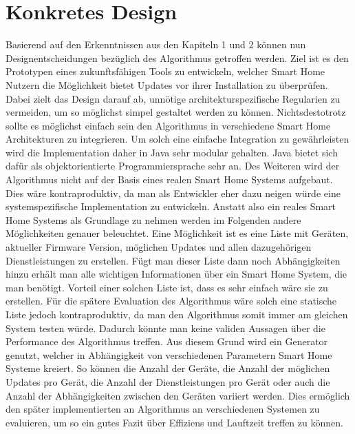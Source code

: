 \section{Konkretes Design}
Basierend auf den Erkenntnissen aus den Kapiteln 1 und 2 können nun Designentscheidungen bezüglich des Algorithmus getroffen
werden. Ziel ist es den Prototypen eines zukunftsfähigen Tools zu entwickeln, welcher Smart Home Nutzern die Möglichkeit bietet
Updates vor ihrer Installation zu überprüfen.
Dabei zielt das Design darauf ab, unnötige architekturspezifische Regularien zu vermeiden, um so möglichst simpel
gestaltet werden zu können. Nichtsdestotrotz sollte es möglichst einfach sein den Algorithmus in verschiedene Smart Home 
Architekturen zu integrieren. Um solch eine einfache Integration zu gewährleisten wird die Implementation daher
in Java sehr modular gehalten. Java bietet sich dafür als objektorientierte Programmiersprache sehr an.
Des Weiteren wird der Algorithmus nicht auf der Basis eines realen Smart Home Systems aufgebaut. Dies wäre kontraproduktiv,
da man als Entwickler eher dazu neigen würde eine systemspezifische Implementation zu entwickeln. Anstatt also ein reales
Smart Home Systems als Grundlage zu nehmen werden im Folgenden andere Möglichkeiten genauer beleuchtet. 
Eine Möglichkeit ist es eine Liste mit 
Geräten, aktueller Firmware Version, möglichen Updates und allen dazugehörigen Dienstleistungen zu erstellen. Fügt
man dieser Liste dann noch Abhängigkeiten hinzu erhält man alle wichtigen Informationen über ein Smart Home System,
die man benötigt. Vorteil einer solchen Liste ist, dass es sehr einfach wäre sie zu erstellen. Für die spätere Evaluation des 
Algorithmus wäre solch eine statische Liste jedoch kontraproduktiv, da man den Algorithmus somit immer am gleichen 
System testen würde. Dadurch könnte man keine validen Aussagen über die Performance des Algorithmus treffen. Aus 
diesem Grund wird ein Generator genutzt, welcher in Abhängigkeit von verschiedenen Parametern Smart Home Systeme kreiert.
So können die Anzahl der Geräte, die Anzahl der möglichen 
Updates pro Gerät, die Anzahl der Dienstleistungen pro Gerät oder auch die Anzahl der Abhängigkeiten zwischen den
Geräten variiert werden. Dies ermöglich den später implementierten an Algorithmus an verschiedenen Systemen zu 
evaluieren, um so ein gutes Fazit über Effiziens und Lauftzeit treffen zu können. 


